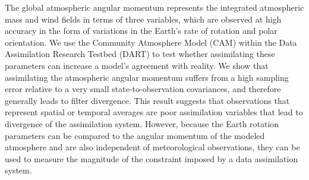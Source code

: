 The global atmospheric angular momentum represents the integrated atmospheric mass and wind fields in terms of three variables, which are observed at high accuracy in the form of variations in the Earth's rate of rotation and polar orientation. 
%
We use the Community Atmosphere Model (CAM) within the Data Assimilation Research Testbed (DART) to test whether assimilating these parameters can increase a model's agreement with reality. 
We show that
assimilating the atmospheric angular momentum suffers from a high sampling error relative to a very small state-to-observation covariances, and therefore
generally leads to filter divergence.
This result suggests that observations that represent spatial or temporal averages are poor assimilation variables that lead to divergence of the assimilation system.  
%
However, because the Earth rotation parameters can be compared to the angular momentum of the modeled atmosphere and are also independent of meteorological observations, they can be used to measure 
the magnitude of the constraint imposed by a data assimilation system.
%
